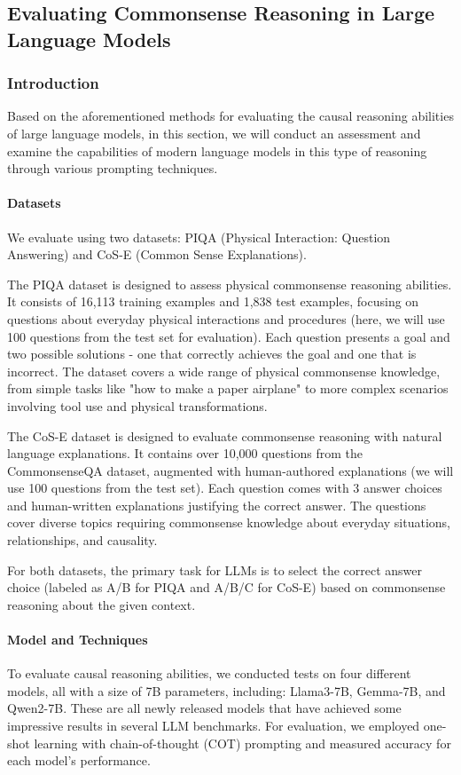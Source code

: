 \subsection{Evaluating Commonsense Reasoning in Large Language Models}

\subsubsection{Introduction}
Based on the aforementioned methods for evaluating the causal reasoning abilities of large language models, in this section, we will conduct an assessment 
and examine the capabilities of modern language models in this type of reasoning through various prompting techniques.

\paragraph{Datasets} We evaluate using two datasets: PIQA (Physical Interaction: Question Answering) and CoS-E (Common Sense Explanations).

The PIQA dataset is designed to assess physical commonsense reasoning abilities. It consists of 16,113 training examples and 1,838 test examples, focusing on questions about everyday physical interactions and procedures (here, we will use 100 questions from the test set for evaluation). Each question presents a goal and two possible solutions - one that correctly achieves the goal and one that is incorrect. The dataset covers a wide range of physical commonsense knowledge, from simple tasks like "how to make a paper airplane" to more complex scenarios involving tool use and physical transformations.

The CoS-E dataset is designed to evaluate commonsense reasoning with natural language explanations. It contains over 10,000 questions from the CommonsenseQA dataset, augmented with human-authored explanations (we will use 100 questions from the test set). Each question comes with 3 answer choices and human-written explanations justifying the correct answer. The questions cover diverse topics requiring commonsense knowledge about everyday situations, relationships, and causality.

For both datasets, the primary task for LLMs is to select the correct answer choice (labeled as A/B for PIQA and A/B/C for CoS-E) based on commonsense reasoning about the given context.

\paragraph{Model and Techniques} To evaluate causal reasoning abilities, we conducted tests on four different models, all with a size of 7B parameters, including: Llama3-7B, Gemma-7B, and Qwen2-7B.
These are all newly released models that have achieved some impressive results in several LLM benchmarks. For evaluation, we employed one-shot learning with chain-of-thought (COT) prompting and measured accuracy for each model's performance.

